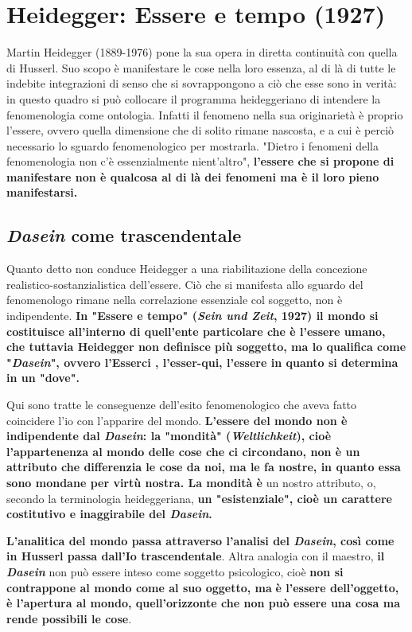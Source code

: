 \section{Heidegger: Essere e tempo (1927)}

Martin Heidegger (1889-1976) pone la sua opera in
diretta continuità con quella di Husserl. Suo scopo
è manifestare le cose nella loro essenza, al di là di
tutte le indebite integrazioni di senso che si sovrappongono a ciò che esse sono in verità: in questo quadro
si può collocare il programma heideggeriano di intendere
la fenomenologia come ontologia. Infatti il fenomeno
nella sua originarietà è proprio l'essere, ovvero quella dimensione
che di solito rimane nascosta, e a cui è perciò necessario
lo sguardo fenomenologico per mostrarla. "Dietro i
fenomeni della fenomenologia non c'è essenzialmente
nient'altro", \textbf{l'essere che si propone di manifestare non è
qualcosa al di là dei fenomeni ma è il loro pieno manifestarsi.}

\subsection{\textit{Dasein} come trascendentale}

Quanto detto non conduce Heidegger a una
riabilitazione della concezione realistico-sostanzialistica dell'essere. Ciò che si manifesta allo sguardo
del fenomenologo rimane nella correlazione
essenziale col soggetto, non è indipendente.
\textbf{In "Essere e tempo" (\textit{Sein und Zeit}, 1927) il mondo
si costituisce all'interno di quell'ente particolare che
è l'essere umano, che tuttavia Heidegger non
definisce più soggetto, ma lo qualifica come
"\textit{Dasein}", ovvero l'Esserci , l'esser-qui, l'essere in
quanto si determina in un "dove".}

Qui sono tratte le
conseguenze dell'esito fenomenologico che aveva fatto
coincidere l'io con l'apparire del mondo.
\textbf{L'essere del mondo non è indipendente dal \textit{Dasein}: la
"mondità" (\textit{Weltlichkeit}), cioè l'appartenenza al mondo
delle cose che ci circondano, non è un attributo che
differenzia le cose da noi, ma le fa nostre, in quanto
essa sono mondane per virtù nostra. La mondità è}
un nostro attributo, o, secondo la terminologia
heideggeriana, \textbf{un "esistenziale", cioè un carattere
costitutivo e inaggirabile del \textit{Dasein}.}


\textbf{L'analitica del mondo passa attraverso l'analisi del
\textit{Dasein}, così come in Husserl passa dall'Io
trascendentale}. Altra analogia con il maestro, \textbf{il
\textit{Dasein}} non può essere inteso come soggetto psicologico,
cioè  \textbf{non si contrappone al mondo come al suo oggetto,
ma} \textbf{è l'essere dell'oggetto, è l'apertura al mondo,
quell'orizzonte che non può essere una cosa ma
rende possibili le cose}.

